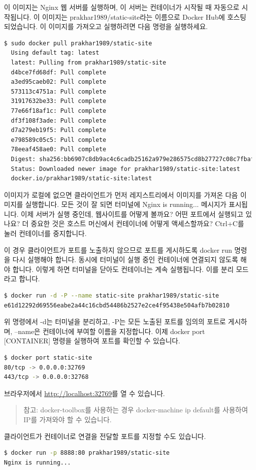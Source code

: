 이 이미지는 Nginx 웹 서버를 실행하며, 이 서버는 컨테이너가 시작될 때 자동으로 시작됩니다. 이 이미지는 prakhar1989/static-site라는 이름으로 Docker Hub에 호스팅되었습니다. 이 이미지를 가져오고 실행하려면 다음 명령을 실행하세요.
\begin{lstlisting}[language=bash]
  $ sudo docker pull prakhar1989/static-site
  Using default tag: latest
  latest: Pulling from prakhar1989/static-site
  d4bce7fd68df: Pull complete 
  a3ed95caeb02: Pull complete 
  573113c4751a: Pull complete 
  31917632be33: Pull complete 
  77e66f18af1c: Pull complete 
  df3f108f3ade: Pull complete 
  d7a279eb19f5: Pull complete 
  e798589c05c5: Pull complete 
  78eeaf458ae0: Pull complete 
  Digest: sha256:bb6907c8db9ac4c6cadb25162a979e286575cd8b27727c08c7fbaf30988534db
  Status: Downloaded newer image for prakhar1989/static-site:latest
  docker.io/prakhar1989/static-site:latest
\end{lstlisting}

이미지가 로컬에 없으면 클라이언트가 먼저 레지스트리에서 이미지를 가져온 다음 이미지를 실행합니다. 모든 것이 잘 되면 터미널에 Nginx is running... 메시지가 표시됩니다. 이제 서버가 실행 중인데, 웹사이트를 어떻게 볼까요? 어떤 포트에서 실행되고 있나요? 더 중요한 것은 호스트 머신에서 컨테이너에 어떻게 액세스할까요? Ctrl+C를 눌러 컨테이너를 중지합니다.

이 경우 클라이언트가 포트를 노출하지 않으므로 포트를 게시하도록 docker run 명령을 다시 실행해야 합니다. 동시에 터미널이 실행 중인 컨테이너에 연결되지 않도록 해야 합니다. 이렇게 하면 터미널을 닫아도 컨테이너는 계속 실행됩니다. 이를 분리 모드라고 합니다.
\begin{lstlisting}[language=bash]
$ docker run -d -P --name static-site prakhar1989/static-site
e61d12292d69556eabe2a44c16cbd54486b2527e2ce4f95438e504afb7b02810
\end{lstlisting}

위 명령에서 -d는 터미널을 분리하고, -P는 모든 노출된 포트를 임의의 포트로 게시하며, --name은 컨테이너에 부여할 이름을 지정합니다. 이제 docker port [CONTAINER] 명령을 실행하여 포트를 확인할 수 있습니다.
\begin{lstlisting}[language=bash]
$ docker port static-site
80/tcp -> 0.0.0.0:32769
443/tcp -> 0.0.0.0:32768
\end{lstlisting}

브라우저에서 \url{http://localhost:32769}를 열 수 있습니다.
\begin{quote}
참고: docker-toolbox를 사용하는 경우 docker-machine ip default를 사용하여 IP를 가져와야 할 수 있습니다.
\end{quote}
클라이언트가 컨테이너로 연결을 전달할 포트를 지정할 수도 있습니다.
\begin{lstlisting}[language=bash]
$ docker run -p 8888:80 prakhar1989/static-site
Nginx is running...
\end{lstlisting}

